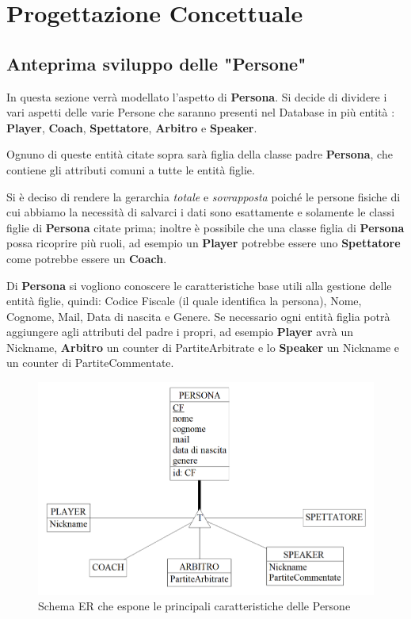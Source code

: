 \documentclass[a4paper,12pt]{report}
\begin{document}
\chapter{Progettazione Concettuale}

\section{Anteprima sviluppo delle "Persone"}
In questa sezione verrà modellato l'aspetto di \textbf{Persona}. Si decide di dividere i vari aspetti delle varie Persone che saranno presenti nel Database in più entità : \textbf{Player}, \textbf{Coach}, \textbf{Spettatore}, \textbf{Arbitro} e \textbf{Speaker}.

Ognuno di queste entità citate sopra sarà figlia della classe padre \textbf{Persona}, che contiene gli attributi comuni a tutte le entità figlie.

Si è deciso di rendere la gerarchia \textit{totale} e \textit{sovrapposta} poiché le persone fisiche di cui abbiamo la necessità di salvarci i dati sono esattamente e solamente le classi figlie di \textbf{Persona} citate prima; inoltre è possibile che una classe figlia di \textbf{Persona} possa ricoprire più ruoli, ad esempio un \textbf{Player} potrebbe essere uno \textbf{Spettatore} come potrebbe essere un \textbf{Coach}.

Di \textbf{Persona} si vogliono conoscere le caratteristiche base utili alla gestione delle entità figlie, quindi: Codice Fiscale (il quale identifica la persona), Nome, Cognome, Mail, Data di nascita e Genere.
Se necessario ogni entità figlia potrà aggiungere agli attributi del padre i propri, ad esempio \textbf{Player} avrà un Nickname, \textbf{Arbitro} un counter di PartiteArbitrate e lo \textbf{Speaker} un Nickname e un counter di PartiteCommentate.

\begin{figure}[!htb]
	\centerline{\includegraphics[scale=0.5]{img/ER_Persona.png}}
	\caption{Schema ER che espone le principali caratteristiche delle Persone}
	\label{img:ER_Persona}
\end{figure}
\end{document}
